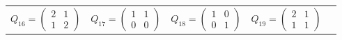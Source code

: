 \documentclass{article}
\begin{document}
\begin{tabular}{lllll}
$Q_{16}=\left(\begin{smallmatrix}2&1\\1&2\end{smallmatrix}\right)$ & $Q_{17}=\left(\begin{smallmatrix}1&1\\0&0\end{smallmatrix}\right)$ & $Q_{18}=\left(\begin{smallmatrix}1&0\\0&1\end{smallmatrix}\right)$ & $Q_{19}=\left(\begin{smallmatrix}2&1\\1&1\end{smallmatrix}\right)$ &  \\[5pt]
\end{tabular}
\renewcommand{\arraystretch}{1.0}
 
\end{document}
